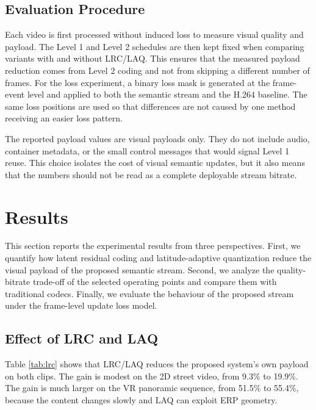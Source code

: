 \documentclass[conference]{IEEEtran}
\begin{document}
\subsection{Evaluation Procedure}

Each video is first processed without induced loss to measure visual quality and payload. The Level 1 and Level 2 schedules are then kept fixed when comparing variants with and without LRC/LAQ. This ensures that the measured payload reduction comes from Level 2 coding and not from skipping a different number of frames. For the loss experiment, a binary loss mask is generated at the frame-event level and applied to both the semantic stream and the H.264 baseline. The same loss positions are used so that differences are not caused by one method receiving an easier loss pattern.

The reported payload values are visual payloads only. They do not include audio, container metadata, or the small control messages that would signal Level 1 reuse. This choice isolates the cost of visual semantic updates, but it also means that the numbers should not be read as a complete deployable stream bitrate.


\section{Results}

This section reports the experimental results from three perspectives. First, we quantify how latent residual coding and latitude-adaptive quantization reduce the visual payload of the proposed semantic stream. Second, we analyze the quality-bitrate trade-off of the selected operating points and compare them with traditional codecs. Finally, we evaluate the behaviour of the proposed stream under the frame-level update loss model.

\subsection{Effect of LRC and LAQ}

Table \ref{tab:lrc} shows that LRC/LAQ reduces the proposed system's own payload on both clips. The gain is modest on the 2D street video, from 9.3\% to 19.9\%. The gain is much larger on the VR panoramic sequence, from 51.5\% to 55.4\%, because the content changes slowly and LAQ can exploit ERP geometry.
\end{document}
